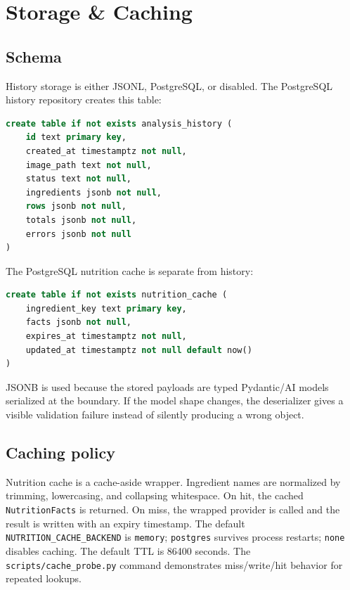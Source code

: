 \documentclass[11pt,a4paper]{article}
\begin{document}
\section{Storage \& Caching}\label{sec:storage}

\subsection{Schema}
History storage is either JSONL, PostgreSQL, or disabled. The PostgreSQL history repository creates this table:

\begin{lstlisting}[style=python,language=sql,numbers=none,basicstyle=\ttfamily\small]
create table if not exists analysis_history (
    id text primary key,
    created_at timestamptz not null,
    image_path text not null,
    status text not null,
    ingredients jsonb not null,
    rows jsonb not null,
    totals jsonb not null,
    errors jsonb not null
)
\end{lstlisting}

The PostgreSQL nutrition cache is separate from history:

\begin{lstlisting}[style=python,language=sql,numbers=none,basicstyle=\ttfamily\small]
create table if not exists nutrition_cache (
    ingredient_key text primary key,
    facts jsonb not null,
    expires_at timestamptz not null,
    updated_at timestamptz not null default now()
)
\end{lstlisting}

JSONB is used because the stored payloads are typed Pydantic/AI models serialized at the boundary. If the model shape changes, the deserializer gives a visible validation failure instead of silently producing a wrong object.

\subsection{Caching policy}
Nutrition cache is a cache-aside wrapper. Ingredient names are normalized by trimming, lowercasing, and collapsing whitespace. On hit, the cached \texttt{NutritionFacts} is returned. On miss, the wrapped provider is called and the result is written with an expiry timestamp. The default \texttt{NUTRITION\_CACHE\_BACKEND} is \texttt{memory}; \texttt{postgres} survives process restarts; \texttt{none} disables caching. The default TTL is 86400 seconds. The \texttt{scripts/cache\_probe.py} command demonstrates miss/write/hit behavior for repeated lookups.
\end{document}
